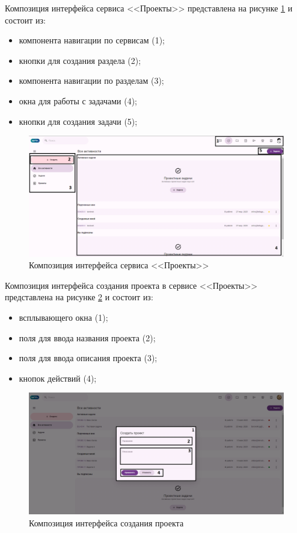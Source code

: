 Композиция интерфейса сервиса <<Проекты>> представлена на рисунке \ref{templ:image7} и состоит из:
\begin{itemize}
  \item компонента навигации по сервисам (1);
  \item кнопки для создания раздела (2);
  \item компонента навигации по разделам (3);
  \item окна для работы с задачами (4);
  \item кнопки для создания задачи (5);
\end{itemize}
\begin{figure}[H]
	\centering
	\includegraphics[width=1\linewidth]{images/проекты}
	\caption{Композиция интерфейса сервиса <<Проекты>>}
	\label{templ:image7}
\end{figure}

Композиция интерфейса создания проекта в сервисе <<Проекты>> представлена на рисунке \ref{templ:image7b} и состоит из:
\begin{itemize}
  \item всплывающего окна (1);
  \item поля для ввода названия проекта (2);
  \item поля для ввода описания проекта (3);
  \item кнопок действий (4);
\end{itemize}
\begin{figure}[H]
	\centering
	\includegraphics[width=1\linewidth]{images/проекты2}
	\caption{Композиция интерфейса создания проекта}
	\label{templ:image7b}
\end{figure}


